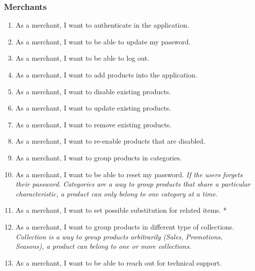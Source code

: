 \subsubsection{Merchants}
\begin{enumerate}[label=USR-\arabic*]
    \item As a merchant, I want to authenticate in the application.
    \item As a merchant, I want to be able to update my password.
    \item As a merchant, I want to be able to log out.
    \item As a merchant, I want to add products into the application.
    \item As a merchant, I want to disable existing products.
    \item As a merchant, I want to update existing products.
    \item As a merchant, I want to remove existing products.
    \item As a merchant, I want to re-enable products that are disabled.
    \item As a merchant, I want to group products in categories.
    \item As a merchant, I want to be able to reset my password. \textit{If 
    the users forgets their password}.
    \textit{Categories are a way to group products that share a particular 
    characteristic, a product can only belong to one category at a time}.
    \item As a merchant, I want to set possible substitution for related items. *
    \item As a merchant, I want to group products in different type of 
    collections. \textit{Collection is a way to group products arbitrarily 
    (Sales, Promotions, Seasons), a product can belong to one or more 
    collections.}
    \item As a merchant, I want to be able to reach out for technical support.
\end{enumerate}
\pagebreak

